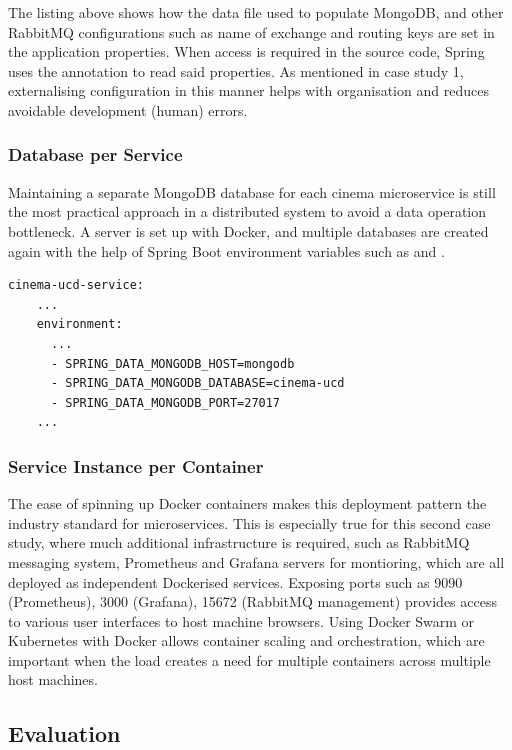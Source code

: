 The listing above shows how the data file used to populate MongoDB, and other RabbitMQ configurations such as name of exchange and routing keys are set in the application properties. When access is required in the source code, Spring uses the  annotation to read said properties. As mentioned in case study 1, externalising configuration in this manner helps with organisation and reduces avoidable development (human) errors.

\subsubsection{Database per Service}

Maintaining a separate MongoDB database for each cinema microservice is still the most practical approach in a distributed system to avoid a data operation bottleneck. A server is set up with Docker, and multiple databases are created again with the help of Spring Boot environment variables such as  and .

\begin{lstlisting}[caption=Snippet from \code{docker-compose.yml} for UCD cinema]
  cinema-ucd-service:
    ...
    environment:
      ...
      - SPRING_DATA_MONGODB_HOST=mongodb
      - SPRING_DATA_MONGODB_DATABASE=cinema-ucd
      - SPRING_DATA_MONGODB_PORT=27017
    ...
\end{lstlisting}

\subsubsection{Service Instance per Container}

The ease of spinning up Docker containers makes this deployment pattern the industry standard for microservices. This is especially true for this second case study, where much additional infrastructure is required, such as RabbitMQ messaging system, Prometheus and Grafana servers for montioring, which are all deployed as independent Dockerised services. Exposing ports such as 9090 (Prometheus), 3000 (Grafana), 15672 (RabbitMQ management) provides access to various user interfaces to host machine browsers. Using Docker Swarm or Kubernetes with Docker allows container scaling and orchestration, which are important when the load creates a need for multiple containers across multiple host machines.

\subsection{Evaluation}

